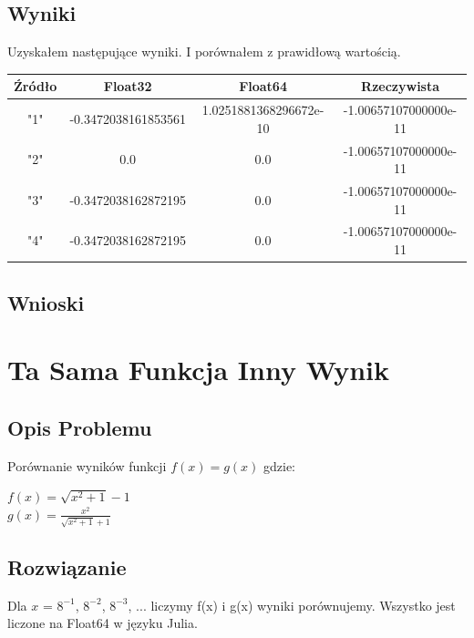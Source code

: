 \documentclass{article}
\begin{document}
\subsection{Wyniki}
    Uzyskałem następujące wyniki. I porównałem z prawidłową wartością.
    \begin{center}
        \begin{tabular}{|c||c|c|c|}
        \hline
            Źródło & Float32 & Float64 & Rzeczywista \\
            \hline\hline
            "1" & -0.3472038161853561 & 1.0251881368296672e-10 & -1.00657107000000e-11\\
             \hline
             "2" & 0.0 & 0.0 & -1.00657107000000e-11\\
             \hline
             "3"& -0.3472038162872195 & 0.0 & -1.00657107000000e-11\\
             \hline
             "4"& -0.3472038162872195 & 0.0 & -1.00657107000000e-11\\
        \hline
        \end{tabular}
    \end{center}
\subsection{Wnioski}

\section{Ta Sama Funkcja Inny Wynik}
\subsection{Opis Problemu}
    Porównanie wyników funkcji $f(x) = g(x)$ gdzie:\\
    \begin{center}
        $f(x)=\sqrt{x^2 + 1} - 1$\\ $g(x)=\frac{x^2}{\sqrt{x^2 +1}+1}$
    \end{center}
\subsection{Rozwiązanie}
    Dla $x$ = $8^{-1}$, $8^{-2}$, $8^{-3}$, ... liczymy f(x) i g(x) wyniki porównujemy. Wszystko jest liczone na Float64 w języku Julia.
\end{document}
